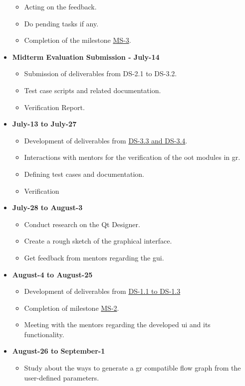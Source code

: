 \begin{itemize}
\begin{itemize}
		\item Acting on the feedback.
		\item Do pending tasks if any.
		\item Completion of the milestone \hyperref[sec: milestones]{MS-3}.
	\end{itemize}
	\item \textbf{Midterm Evaluation Submission - July-14}
	\begin{itemize}
		\item Submission of deliverables from DS-2.1 to DS-3.2.
		\item Test case scripts and related documentation.
		\item Verification Report.
	\end{itemize}
	\item \textbf{July-13 to July-27}
	\begin{itemize}
		\item Development of deliverables from \hyperref[sec: deliverables]{DS-3.3 and DS-3.4}.
		 \item Interactions with mentors for the verification of the \ac{oot} modules in \ac{gr}.
		\item Defining test cases and documentation.
		\item Verification
	\end{itemize}
	\item \textbf{July-28 to August-3}
	\begin{itemize}
		\item Conduct research on the Qt Designer.
		\item Create a rough sketch of the graphical interface.
		\item Get feedback from mentors regarding the \ac{gui}.
	\end{itemize}
	\item \textbf{August-4 to August-25}
	\begin{itemize}
		\item Development of deliverables from \hyperref[sec: deliverables]{DS-1.1 to DS-1.3}
		\item Completion of milestone \hyperref[sec: milestones]{MS-2}.
		\item Meeting with the mentors regarding the developed \ac{ui} and its functionality.
	\end{itemize}
	\item \textbf{August-26 to September-1}
	\begin{itemize}
		\item Study about the ways to generate a \acl{gr} compatible flow graph from the user-defined parameters.

\end{itemize}
\end{itemize}
